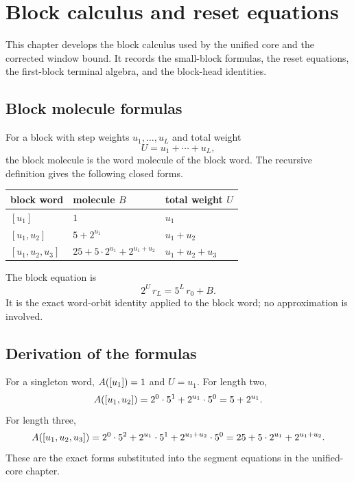 \section{Block calculus and reset equations}

This chapter develops the block calculus used by the unified core and
the corrected window bound.  It records the small-block formulas, the
reset equations, the first-block terminal algebra, and the block-head
identities.

\subsection{Block molecule formulas}

For a block with step weights $u_1,\dots,u_L$ and total weight
\begin{equation*}
  U=u_1+\cdots+u_L,
\end{equation*}
the block molecule is the word molecule of the block word.  The
recursive definition gives the following closed forms.

\begin{center}
\small
\begin{tabular}{@{}lll@{}}
\toprule
block word & molecule $B$ & total weight $U$ \\
\midrule
$[u_1]$ & $1$ & $u_1$ \\
$[u_1,u_2]$ & $5+2^{u_1}$ & $u_1+u_2$ \\
$[u_1,u_2,u_3]$ & $25+5\cdot2^{u_1}+2^{u_1+u_2}$ & $u_1+u_2+u_3$ \\
\bottomrule
\end{tabular}
\end{center}

The block equation is
\begin{equation*}
  2^U\,r_L=5^L\,r_0+B.
\end{equation*}
It is the exact word-orbit identity applied to the block word; no
approximation is involved.

\subsection{Derivation of the formulas}

For a singleton word, $A([u_1])=1$ and $U=u_1$.  For length two,
\begin{equation*}
  A([u_1,u_2])
    =2^0\cdot5^1+2^{u_1}\cdot5^0
    =5+2^{u_1}.
\end{equation*}
For length three,
\begin{equation*}
  A([u_1,u_2,u_3])
    =2^0\cdot5^2+2^{u_1}\cdot5^1+2^{u_1+u_2}\cdot5^0
    =25+5\cdot2^{u_1}+2^{u_1+u_2}.
\end{equation*}
These are the exact forms substituted into the segment equations in
the unified-core chapter.

